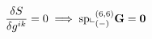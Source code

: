 \documentclass[preview]{standalone}
\begin{document}
\begin{align*}
\special{dvisvgm:raw <g id='unique000'>}\frac{\delta S}{\delta g^{ik}} = 0 \implies \operatorname{sp}\llcorner_{(-)}^{(6,6)}\mathbf{G} = \mathbf{0}\special{dvisvgm:raw </g>}
\end{align*}
\end{document}
